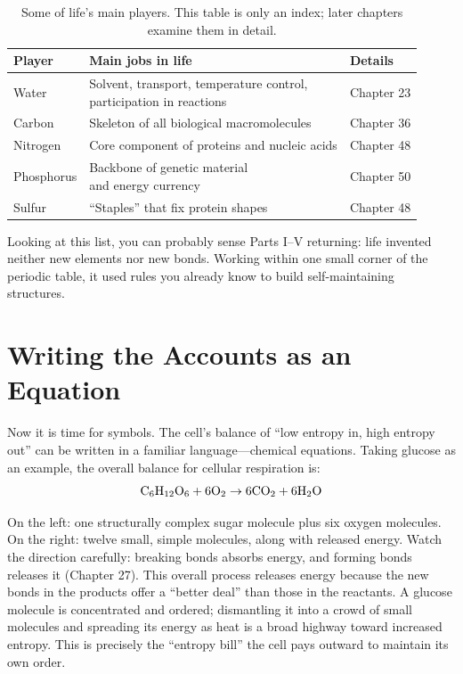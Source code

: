 \begin{table}[htbp]
\centering
\begin{tabular}{lll}
\toprule
Player & Main jobs in life & Details \\
\midrule
Water & \shortstack[l]{Solvent, transport, temperature control,\\participation in reactions} & Chapter 23 \\
Carbon & Skeleton of all biological macromolecules & Chapter 36 \\
Nitrogen & Core component of proteins and nucleic acids & Chapter 48 \\
Phosphorus & \shortstack[l]{Backbone of genetic material\\and energy currency} & Chapter 50 \\
Sulfur & ``Staples'' that fix protein shapes & Chapter 48 \\
\bottomrule
\end{tabular}
\caption{Some of life's main players. This table is only an index; later chapters examine them in detail.}
\end{table}

Looking at this list, you can probably sense Parts I--V returning: life invented neither new elements nor new bonds. Working within one small corner of the periodic table, it used rules you already know to build self-maintaining structures.

\section{Writing the Accounts as an Equation}

Now it is time for symbols. The cell's balance of ``low entropy in, high entropy out'' can be written in a familiar language---chemical equations. Taking glucose as an example, the overall balance for cellular respiration is:
\[\mathrm{C_6H_{12}O_6} + \mathrm{6O_2} \rightarrow \mathrm{6CO_2} + \mathrm{6H_2O}\]

On the left: one structurally complex sugar molecule plus six oxygen molecules. On the right: twelve small, simple molecules, along with released energy. Watch the direction carefully: breaking bonds absorbs energy, and forming bonds releases it (Chapter 27). This overall process releases energy because the new bonds in the products offer a ``better deal'' than those in the reactants. A glucose molecule is concentrated and ordered; dismantling it into a crowd of small molecules and spreading its energy as heat is a broad highway toward increased entropy. This is precisely the ``entropy bill'' the cell pays outward to maintain its own order.

